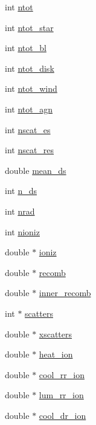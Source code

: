 \begin{DoxyCompactItemize}
\item 
int \hyperlink{structplasma_aa22c8b26e65db4f93a14fa183d7e09e6}{ntot}
\item 
int \hyperlink{structplasma_a2e85980821d61738e7b5b6455604066b}{ntot\+\_\+star}
\item 
int \hyperlink{structplasma_aec5dcc811c48f5b8f8d195accbdb7813}{ntot\+\_\+bl}
\item 
int \hyperlink{structplasma_a0c76211532161bfdd92ccde2b4aacffd}{ntot\+\_\+disk}
\item 
int \hyperlink{structplasma_a94bce860bda9cee5964584ca552b256a}{ntot\+\_\+wind}
\item 
int \hyperlink{structplasma_aacb5d70931f73523be11b5bb9bb051a6}{ntot\+\_\+agn}
\item 
int \hyperlink{structplasma_ad9c354375042457b537f41282f6d7538}{nscat\+\_\+es}
\item 
int \hyperlink{structplasma_aa13320251f70b79c8794a90cf70fe003}{nscat\+\_\+res}
\item 
double \hyperlink{structplasma_a50251baa932d22c94584c04ce0398a36}{mean\+\_\+ds}
\item 
int \hyperlink{structplasma_a579b07a98a0b0692e5e6e2465c2ab425}{n\+\_\+ds}
\item 
int \hyperlink{structplasma_ab2eba1f8343e4767fd32dc914fb95397}{nrad}
\item 
int \hyperlink{structplasma_ada72c65c218f315e543710ce8808e225}{nioniz}
\item 
double $\ast$ \hyperlink{structplasma_ad5797671f1fe6d9e2a638df668ea51df}{ioniz}
\item 
double $\ast$ \hyperlink{structplasma_abfec36000559630caf4ec85917950a1e}{recomb}
\item 
double $\ast$ \hyperlink{structplasma_ae60f001b2bf22f33edb3e818e55f6807}{inner\+\_\+recomb}
\item 
int $\ast$ \hyperlink{structplasma_ada2361ccbc0c5103f58d097af8b5dfe7}{scatters}
\item 
double $\ast$ \hyperlink{structplasma_aba12a0eea107e923bad5f26cb012e72a}{xscatters}
\item 
double $\ast$ \hyperlink{structplasma_a1cff49185ad30a6734089a2d2c949fbc}{heat\+\_\+ion}
\item 
double $\ast$ \hyperlink{structplasma_a0d74b5ee435184a0bf1f2dbdecc16a2d}{cool\+\_\+rr\+\_\+ion}
\item 
double $\ast$ \hyperlink{structplasma_a82db22eb07618b0844344790fc875166}{lum\+\_\+rr\+\_\+ion}
\item 
double $\ast$ \hyperlink{structplasma_ad69c6b875d8b97df4e10569a06085107}{cool\+\_\+dr\+\_\+ion}

\end{DoxyCompactItemize}
